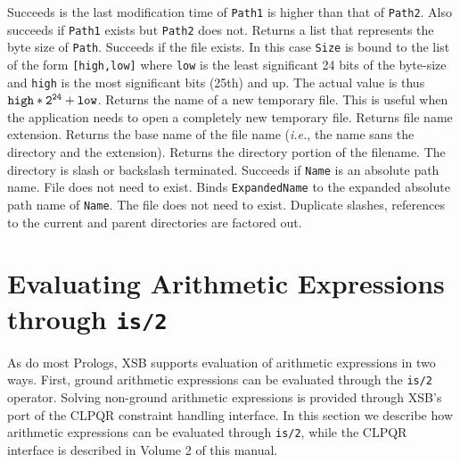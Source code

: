 \begin{description}
  Succeeds is the last modification time of {\tt Path1} is higher than that
  of {\tt Path2}. Also succeeds if {\tt Path1} exists but {\tt Path2} does
  not.
  Returns a list that represents the byte size of {\tt Path}.
  Succeeds if the file exists. In this case {\tt Size} is bound to the list
  of the form {\tt [high,low]} where {\tt low} is the least significant 24
  bits of the byte-size and {\tt high} is the most significant bits (25th)
  and up. The actual value is thus $\tt high*2^{24} + low$.
  Returns the name of a new temporary file. This is useful when the
  application needs to open a completely new temporary file.
  Returns file name extension.
  Returns the base name of the file name ({\it i.e.}, the name sans the
  directory and the extension).
  Returns the directory portion of the filename. The directory is slash or
  backslash terminated.
  Succeeds if {\tt Name} is an absolute path name. File does not need to exist.
  Binds {\tt ExpandedName} to the expanded absolute path name of {\tt Name}.
  The file does not need to exist. Duplicate slashes, references to the
  current and parent directories are factored out.
\end{description}

\section{Evaluating Arithmetic Expressions through {\tt is/2}}
\label{Arithmetic} 

As do most Prologs, XSB supports evaluation of arithmetic expressions
in two ways.  First, ground arithmetic expressions can be evaluated
through the {\tt is/2} operator.  Solving non-ground arithmetic
expressions is provided through XSB's port of the CLPQR constraint
handling interface.  In this section we describe how arithmetic
expressions can be evaluated through {\tt is/2}, while the CLPQR
interface is described in Volume 2 of this manual.


